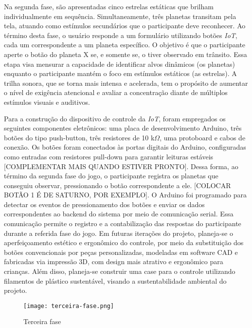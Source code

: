Na segunda fase, são apresentadas cinco estrelas estáticas que brilham individualmente em sequência. Simultaneamente, três planetas transitam pela tela, atuando como estímulos secundários que o participante deve reconhecer. Ao término desta fase, o usuário responde a um formulário utilizando botões \textit{IoT}, cada um correspondente a um planeta específico. O objetivo é que o participante aperte o botão do planeta X se, e somente se, o tiver observado em trânsito. Essa etapa visa mensurar a capacidade de identificar alvos dinâmicos (os planetas) enquanto o participante mantém o foco em estímulos estáticos (as estrelas). A trilha sonora, que se torna mais intensa e acelerada, tem o propósito de aumentar o nível de exigência atencional e avaliar a concentração diante de múltiplos estímulos visuais e auditivos.

Para a construção do dispositivo de controle da \textit{IoT}, foram empregados os seguintes componentes eletrônicos: uma placa de desenvolvimento Arduino, três botões do tipo push-button, três resistores de 10 k$\Omega$, uma protoboard e cabos de conexão. Os botões foram conectados às portas digitais do Arduino, configuradas como entradas com resistores pull-down para garantir leituras estáveis [COMPLEMENTAR MAIS QUANDO ESTIVER PRONTO]. Dessa forma, ao término da segunda fase do jogo, o participante registra os planetas que conseguiu observar, pressionando o botão correspondente a ele. [COLOCAR BOTÃO 1 É DE SATURNO, POR EXEMPLO]. O Arduino foi programado para detectar os eventos de pressionamento dos botões e enviar os dados correspondentes ao backend do sistema por meio de comunicação serial. Essa comunicação permite o registro e a contabilização das respostas do participante durante a referida fase do jogo. Em futuras iterações do projeto, planeja-se o aperfeiçoamento estético e ergonômico do controle, por meio da substituição dos botões convencionais por peças personalizadas, modeladas em software CAD e fabricadas via impressão 3D, com design mais atrativo e ergonômico para crianças. Além disso, planeja-se construir uma case para o controle utilizando filamentos de plástico sustentável, visando a sustentabilidade ambiental do projeto.

\begin{figure}[H]
    \centering
    \caption{Terceira fase}%
    \label{fig:terceira-fase}
    \texttt{[image: terceira-fase.png]}%
\end{figure}

